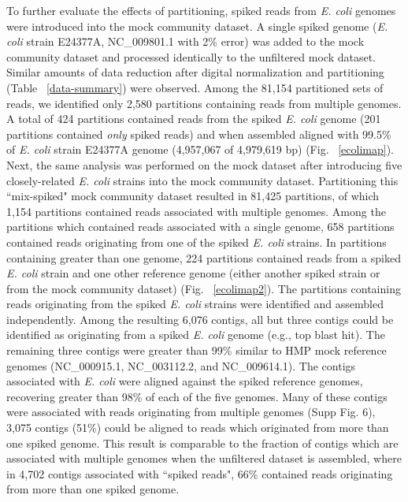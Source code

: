\documentclass[11pt]{article} %
\begin{document}
To further evaluate the effects of partitioning, spiked reads from
\emph{E. coli} genomes were introduced into the mock community
dataset. A single spiked genome (\emph{E. coli} strain E24377A,
NC\_009801.1 with 2\% error) was added to the mock community dataset
and processed identically to the unfiltered mock dataset.  Similar
amounts of data reduction after digital normalization and partitioning
(Table ~\ref{data-summary}) were observed.  Among the 81,154
partitioned sets of reads, we identified only 2,580 partitions
containing reads from multiple genomes.  A total of 424 partitions
contained reads from the spiked \emph{E. coli} genome (201 partitions
contained \emph{only} spiked reads) and when assembled aligned with
99.5\% of \emph{E. coli} strain E24377A genome (4,957,067 of 4,979,619
bp) (Fig. ~\ref{ecolimap}).  Next, the same analysis was performed on
the mock dataset after introducing five closely-related \emph{E. coli}
strains into the mock community dataset.  Partitioning this
``mix-spiked" mock community dataset resulted in 81,425 partitions, of
which 1,154 partitions contained reads associated with multiple
genomes.  Among the partitions which contained reads associated with a
single genome, 658 partitions contained reads originating from one of
the spiked \emph{E. coli} strains.  In partitions containing greater
than one genome, 224 partitions contained reads from a spiked
\emph{E. coli} strain and one other reference genome (either another
spiked strain or from the mock community dataset)
(Fig. ~\ref{ecolimap2}).  The partitions containing reads originating
from the spiked \emph{E. coli} strains were identified and assembled
independently.  Among the resulting 6,076 contigs, all but three
contigs could be identified as originating from a spiked
\emph{E. coli} genome (e.g., top blast hit).  The remaining three
contigs were greater than 99\% similar to HMP mock reference genomes
(NC\_000915.1, NC\_003112.2, and NC\_009614.1).  The contigs
associated with \emph{E. coli} were aligned against the spiked
reference genomes, recovering greater than 98\% of each of the five
genomes.  Many of these contigs were associated with reads originating
from multiple genomes (Supp Fig. 6), 3,075
contigs (51\%) could be aligned to reads which originated from more
than one spiked genome.  This result is comparable to the fraction of
contigs which are associated with multiple genomes when the unfiltered
dataset is assembled, where in 4,702 contigs associated with ``spiked
reads", 66\% contained reads originating from more than one spiked
genome.
\end{document}
